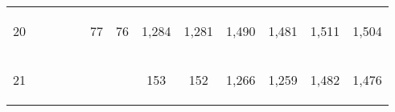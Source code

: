 \begin{center}
\begin{tabular}{lcccccccccccc}
20 & \begin{bf}\end{bf} & \begin{rm}\end{rm} & \begin{bf}\end{bf} & \begin{rm}\end{rm} & \begin{bf}77\end{bf} & \begin{rm}76\end{rm} & \begin{bf}1,284\end{bf} & \begin{rm}1,281\end{rm} & \begin{bf}1,490\end{bf} & \begin{rm}1,481\end{rm} & \begin{bf}1,511\end{bf} & \begin{rm}1,504\end{rm}\\
21 & \begin{bf}\end{bf} & \begin{rm}\end{rm} & \begin{bf}\end{bf} & \begin{rm}\end{rm} & \begin{bf}\end{bf} & \begin{rm}\end{rm} & \begin{bf}153\end{bf} & \begin{rm}152\end{rm} & \begin{bf}1,266\end{bf} & \begin{rm}1,259\end{rm} & \begin{bf}1,482\end{bf} & \begin{rm}1,476\end{rm}\\

\end{tabular}
\end{center}
